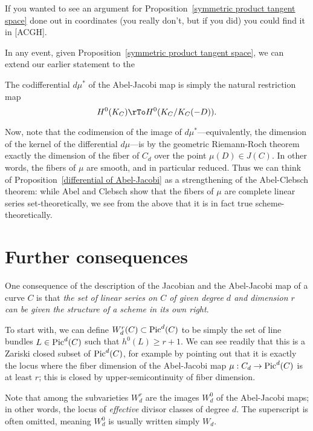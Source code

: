 
If you wanted to see an argument for Proposition~\ref{symmetric product tangent space} done out in coordinates (you really don't, but if you did) you could find it in [ACGH].

In any event, given Proposition~\ref{symmetric product tangent space}, we can extend our earlier statement to the

\begin{proposition}\label{differential of Abel-Jacobi}
The codifferential $d\mu^*$ of the Abel-Jacobi map is simply the natural restriction map
$$
H^0(K_C) \rTo H^0(K_C/K_C(-D)).
$$
\end{proposition}

Now, note that the codimension of the image of $d\mu^*$---equivalently, the dimension of the kernel of the differential $d\mu$---is by the geometric Riemann-Roch theorem exactly the dimension of the fiber of $C_d$ over the point $\mu(D) \in J(C)$. In other words, the fibers of $\mu$ are smooth, and in particular reduced. Thus we can think of Proposition~\ref{differential of Abel-Jacobi} as a strengthening of the Abel-Clebsch theorem: while Abel and Clebsch show that the fibers of $\mu$ are complete linear series set-theoretically, we see from the above that it is in fact true scheme-theoretically.

\section{Further consequences}

One consequence of the description of the Jacobian and the Abel-Jacobi map of a curve $C$ is that \emph{the set of linear series on $C$ of given degree $d$ and dimension $r$ can be given the structure of a scheme in its own right}.

To start with, we can define $W^r_d(C) \subset \Pic^d(C)$ to be simply the set of line bundles $L \in \Pic^d(C)$ such that $h^0(L) \geq r+1$. We can see readily that this is a Zariski closed subset of $\Pic^d(C)$, for example by pointing out that it is exactly the locus where the fiber dimension of the Abel-Jacobi map $\mu : C_d \to \Pic^d(C)$ is at least $r$; this is closed by upper-semicontinuity of fiber dimension. 

Note that among the subvarieties $W^r_d$ are the images $W^0_d$ of the Abel-Jacobi maps; in other words, the locus of \emph{effective} divisor classes of degree $d$. The superscript is often omitted, meaning $W^0_d$ is usually written simply $W_d$.

